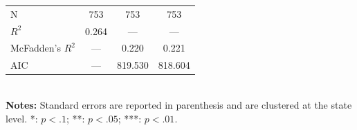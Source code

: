 \documentclass{article}
\begin{document}
\begin{center}
\begin{threeparttable}[hbtp!]
\begin{tabular}{l|ccc|}
\multicolumn{1}{|l|}{N}             & 753      & 753      & 753      \\
\multicolumn{1}{|l|}{$R^2$}            & 0.264    & ---      & ---      \\
\multicolumn{1}{|l|}{McFadden’s $R^2$} & ---      & 0.220    & 0.221    \\
\multicolumn{1}{|l|}{AIC}           & ---      & 819.530  & 818.604  \\ \hline
\end{tabular}\\[.25em]
\footnotesize{\textbf{Notes:} Standard errors are reported in parenthesis and are clustered at the state level. *: $p<.1$; **: $p<.05$; ***: $p<.01$.}
\end{threeparttable}
\end{center}
\end{document}
